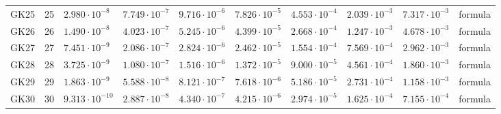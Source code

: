 {\begin{longtable}{@{}llllllllll@{}}
GK25 & 25 & $2.980\cdot 10^{-8}$ & $7.749\cdot 10^{-7}$ & $9.716\cdot 10^{-6}$ & $7.826\cdot 10^{-5}$ & $4.553\cdot 10^{-4}$ & $2.039\cdot 10^{-3}$ & $7.317\cdot 10^{-3}$ & formula \\
GK26 & 26 & $1.490\cdot 10^{-8}$ & $4.023\cdot 10^{-7}$ & $5.245\cdot 10^{-6}$ & $4.399\cdot 10^{-5}$ & $2.668\cdot 10^{-4}$ & $1.247\cdot 10^{-3}$ & $4.678\cdot 10^{-3}$ & formula \\
GK27 & 27 & $7.451\cdot 10^{-9}$ & $2.086\cdot 10^{-7}$ & $2.824\cdot 10^{-6}$ & $2.462\cdot 10^{-5}$ & $1.554\cdot 10^{-4}$ & $7.569\cdot 10^{-4}$ & $2.962\cdot 10^{-3}$ & formula \\
GK28 & 28 & $3.725\cdot 10^{-9}$ & $1.080\cdot 10^{-7}$ & $1.516\cdot 10^{-6}$ & $1.372\cdot 10^{-5}$ & $9.000\cdot 10^{-5}$ & $4.561\cdot 10^{-4}$ & $1.860\cdot 10^{-3}$ & formula \\
GK29 & 29 & $1.863\cdot 10^{-9}$ & $5.588\cdot 10^{-8}$ & $8.121\cdot 10^{-7}$ & $7.618\cdot 10^{-6}$ & $5.186\cdot 10^{-5}$ & $2.731\cdot 10^{-4}$ & $1.158\cdot 10^{-3}$ & formula \\
GK30 & 30 & $9.313\cdot 10^{-10}$ & $2.887\cdot 10^{-8}$ & $4.340\cdot 10^{-7}$ & $4.215\cdot 10^{-6}$ & $2.974\cdot 10^{-5}$ & $1.625\cdot 10^{-4}$ & $7.155\cdot 10^{-4}$ & formula \\
\end{longtable}}
